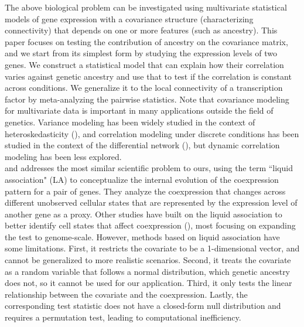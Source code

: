 \documentclass[aap,authoryear, preprint]{imsart}
\numberwithin{equation}{section}
\theoremstyle{plain}
\begin{document}
The above biological problem can be investigated using multivariate statistical models of gene expression with a covariance structure (characterizing connectivity) that depends on one or more features (such as ancestry). This paper focuses on testing the contribution of ancestry on the covariance matrix, and we start from its simplest form by studying the expression levels of two genes. We construct a statistical model that can explain how their correlation varies against genetic ancestry and use that to test if the correlation is constant across conditions. We generalize it to the local connectivity of a transcription factor by meta-analyzing the pairwise statistics. Note that covariance modeling for multivariate data is important in many applications outside the field of genetics. Variance modeling has been widely studied in the context of heteroskedasticity (\cite{breusch1979simple, glejser1969new, white1980heteroskedasticity}), and correlation modeling under discrete conditions has been studied in the context of the differential network (\cite{ideker2012differential}), but dynamic correlation modeling has been less explored. \\

\cite{li2002genome} and \cite{li2004system} addresses the most similar scientific problem to ours, using the term ``liquid association" (LA) to conceptualize the internal evolution of the coexpression pattern for a pair of genes. They analyze the coexpression that changes across different unobserved cellular states that are represented by the expression level of another gene as a proxy. Other studies have built on the liquid association to better identify cell states that affect coexpression (\cite{yan2017detecting, yu2018new}), most focusing on expanding the test to genome-scale. However, methods based on liquid association have some limitations. First, it restricts the covariate to be a 1-dimensional vector, and cannot be generalized to more realistic scenarios. Second, it treats the covariate as a random variable that follows a normal distribution, which genetic ancestry does not, so it cannot be used for our application. Third, it only tests the linear relationship between the covariate and the coexpression. Lastly, the corresponding test statistic does not have a closed-form null distribution and requires a permutation test, leading to computational inefficiency. \\
\end{document}
